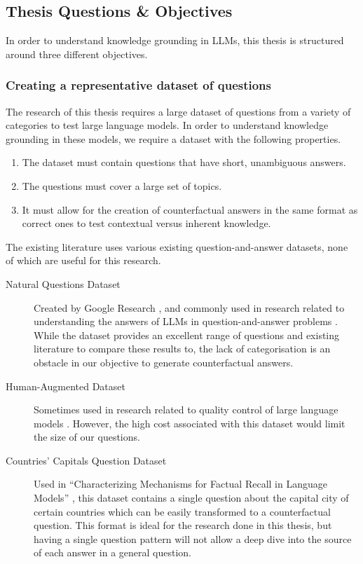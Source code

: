 \newpage{}

\subsection{Thesis Questions \& Objectives}

In order to understand knowledge grounding in LLMs, this thesis is structured around three different objectives.

\subsubsection{Creating a representative dataset of questions}

The research of this thesis requires a large dataset of questions from a variety of categories to test large language models.
In order to understand knowledge grounding in these models, we require a dataset with the following properties.
\begin{enumerate}
	\item The dataset must contain questions that have short, unambiguous answers.
	\item The questions must cover a large set of topics.
	\item It must allow for the creation of counterfactual answers in the same format as correct ones to test contextual versus inherent knowledge.
\end{enumerate}

The existing literature uses various existing question-and-answer datasets, none of which are useful for this research.\footnotemark{}
\begin{description}
	\item[Natural Questions Dataset] Created by Google Research \citep{natural_questions}, and commonly used in research related to understanding the answers of LLMs in question-and-answer problems \citep{ragged,when_not_to_trust_llms,can_rag_models_reason}.
		While the dataset provides an excellent range of questions and existing literature to compare these results to, the lack of categorisation is an obstacle in our objective to generate counterfactual answers.
	\item[Human-Augmented Dataset] Sometimes used in research related to quality control of large language models \citep{learning_the_difference}.
		However, the high cost associated with this dataset would limit the size of our questions.
	\item[Countries' Capitals Question Dataset] Used in ``Characterizing Mechanisms for Factual Recall in Language Models'' \citep{factual_recall}, this dataset contains a single question about the capital city of certain countries which can be easily transformed to a counterfactual question.
		This format is ideal for the research done in this thesis, but having a single question pattern will not allow a deep dive into the source of each answer in a general question.
\end{description}

